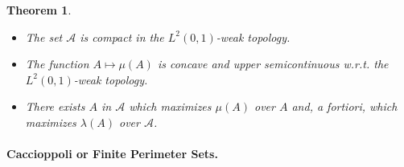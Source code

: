 \documentclass{book}
\numberwithin{equation}{section}
\newtheorem{theorem}{Theorem}[section]
\begin{document}
\begin{enumerate}
    \begin{theorem}
        \begin{itemize}
            \item[(i)] The set $\mathcal{A}$ is compact in the $L^2(0,1)$-weak topology.
            \item[(ii)] The function $A\mapsto\mu(A)$ is concave and upper semicontinuous w.r.t. the $L^2(0,1)$-weak topology.
            \item[(iii)] There exists $A$ in $\mathcal{A}$ which maximizes $\mu(A)$ over $A$ and, a fortiori, which maximizes $\lambda(A)$ over $\mathcal{A}$.
        \end{itemize}
    \end{theorem}
\end{enumerate}

\paragraph{Caccioppoli or Finite Perimeter Sets.}
\end{document}
